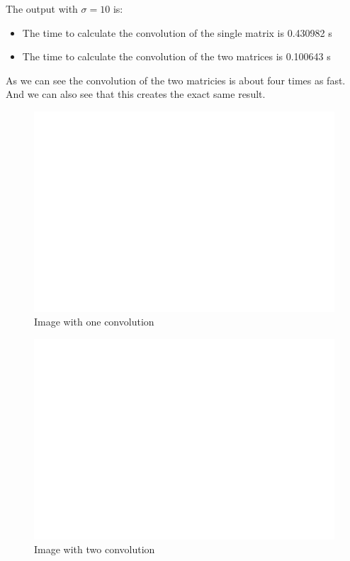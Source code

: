 \documentclass[11pt]{article}
\begin{document}
The output with \(\sigma=10\) is:
\begin{itemize}
\item The time to calculate the convolution of the single matrix is 0.430982 s
\item The time to calculate the convolution of the two matrices is 0.100643 s
\end{itemize}
As we can see the convolution of the two matricies is about four times as fast. And we can also see that this creates the exact same result.\\
\begin{FIGURE}
\begin{figure}[htbp]
\centering
\includegraphics[width=.9\linewidth]{ENG204-Assignment-3-Single-sigma-10.png}
\caption{Image with one convolution}
\end{figure}
\end{FIGURE}
\begin{FIGURE}
\begin{figure}[htbp]
\centering
\includegraphics[width=.9\linewidth]{ENG204-Assignment-3-Double-sigma-10.png}
\caption{Image with two convolution}
\end{figure}
\end{FIGURE}
\end{document}
